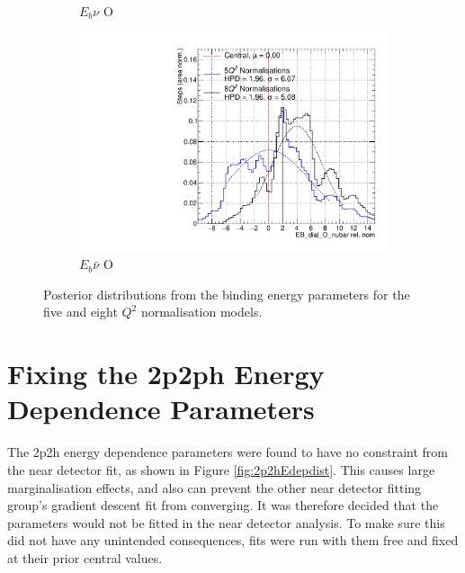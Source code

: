 \begin{figure}
\begin{subfigure}{.48\textwidth}
  \caption{$E_{b}\nu$ O}
\end{subfigure}
\begin{subfigure}{.48\textwidth}
  \centering
  \includegraphics[width=0.73\linewidth]{figs/Q2_EB_dial_O_nubar}
  \caption{$E_{b}\bar{\nu}$ O}
\end{subfigure}
\caption{Posterior distributions from the binding energy parameters for the five and eight $Q^2$ normalisation models.}
\label{fig:Q2Ebdata}
\end{figure}

\section{Fixing the 2p2ph Energy Dependence Parameters}

The 2p2h energy dependence parameters were found to have no constraint from the near detector fit, as shown in Figure \ref{fig:2p2hEdepdist}. This causes large marginalisation effects, and also can prevent the other near detector fitting group's gradient descent fit from converging. It was therefore decided that the parameters would not be fitted in the near detector analysis. 
To make sure this did not have any unintended consequences, fits were run with them free and fixed at their prior central values.

